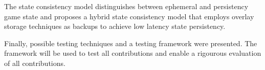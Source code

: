 \documentclass[journal,oneside,a4paper,onecolumn]{IEEEtran}
\begin{document}
The state consistency model distinguishes between ephemeral and persistency game state and proposes a hybrid state consistency model that employs overlay storage techniques as backups to achieve low latency state persistency.

Finally, possible testing techniques and a testing framework were presented. The framework will be used to test all contributions and enable a rigourous evaluation of all contributions.

\newpage



\end{document}
